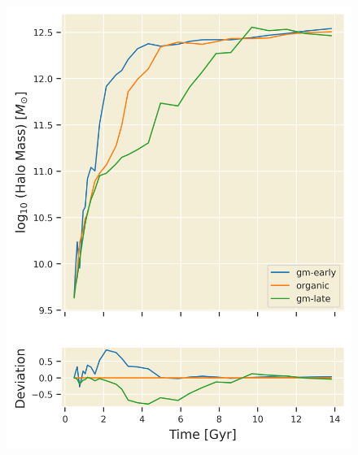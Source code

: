 \documentclass[twocolumn]{article}
\begin{document}
	\begin{figure}
			\centering 
			\includegraphics[width=\columnwidth]{./Halo_mass.png}
	\end{figure}
\end{document}

